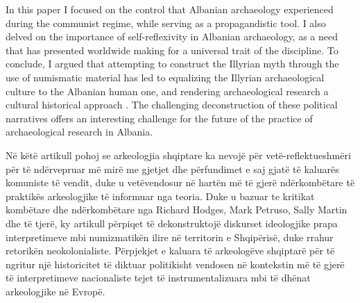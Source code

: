	In this paper I focused on the control that Albanian archaeology experienced during the communist regime, while serving as a propagandistic tool. I also delved on the importance of self-reflexivity in Albanian archaeology, as a need that has presented worldwide making for a universal trait of the discipline. To conclude, I argued that attempting to construct the Illyrian myth through the use of numismatic material has led to equalizing the Illyrian archaeological culture to the Albanian human one, and rendering archaeological research a cultural historical approach \parencite[18]{Johnson2010}. The challenging deconstruction of these political narratives offers an interesting challenge for the future of the practice of archaeological research in Albania.	
\myseparator
\begin{myabstract}  
			Në këtë artikull pohoj se arkeologjia shqiptare ka nevojë për vetë-reflektueshmëri për të ndërve\-pruar më mirë me gjetjet dhe përfundimet e saj gjatë të kaluarës komuniste të vendit, duke u vetëvendosur në hartën më të gjerë ndërkombëtare të praktikës arkeologjike të informuar nga teoria. Duke u bazuar te kritikat kombëtare dhe ndërkombëtare nga Richard Hodges, Mark Petruso, Sally Martin dhe të tjerë, ky artikull përpiqet të dekonstruktojë diskurset ideologjike prapa interpretimeve mbi numizmatikën ilire në territorin e Shqipërisë, duke rrahur retorikën neokolonialiste. Përpjekjet e kaluara të arkeologëve shqiptarë për të ngritur një historicitet të diktuar politikisht vendosen në kontekstin më të gjerë të interpretimeve nacionaliste tejet të instrumentalizuara mbi të dhënat arkeologjike në Evropë.
			
	\end{myabstract}

\printbibliography[heading=subbibnumbered] 
\label{bekteshi:lastpage}
\closingarticle
